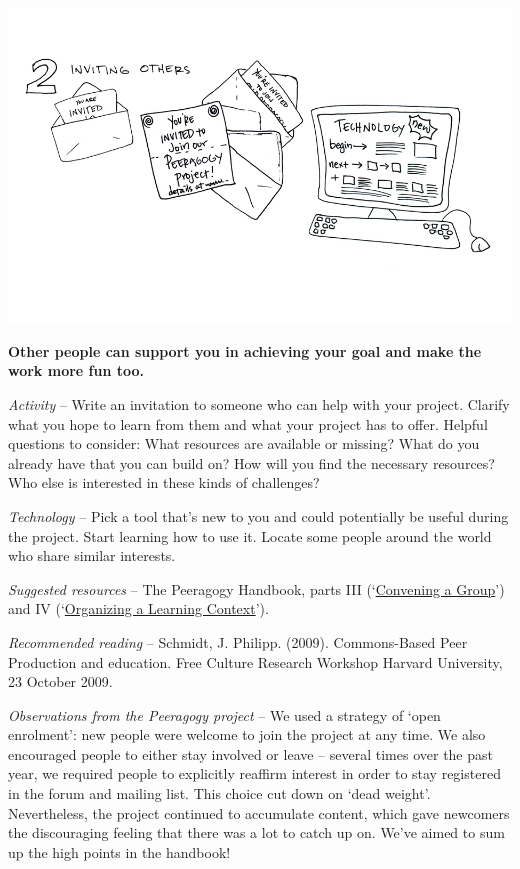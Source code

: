 \begin{center}
\includegraphics{./pictures/OpenBook-2-2.jpg}
\end{center}

\textbf{Other people can support you in achieving your goal and make the
work more fun too.}

\emph{Activity} -- Write an invitation to someone who can help with your
project. Clarify what you hope to learn from them and what your project
has to offer. Helpful questions to consider: What resources are
available or missing? What do you already have that you can build on?
How will you find the necessary resources? Who else is interested in
these kinds of challenges?

\emph{Technology} -- Pick a tool that's new to you and could potentially
be useful during the project. Start learning how to use it. Locate some
people around the world who share similar interests.

\emph{Suggested resources} -- The Peeragogy Handbook, parts III
(`\href{http://peeragogy.org/convening-a-group/}{Convening a Group}')
and IV
(`\href{http://peeragogy.org/organizing-a-learning-context/}{Organizing
a Learning Context}').

\emph{Recommended reading} -- Schmidt, J. Philipp. (2009). Commons-Based
Peer Production and education. Free Culture Research Workshop Harvard
University, 23 October 2009.

\emph{Observations from the Peeragogy project} -- We used a strategy of
`open enrolment': new people were welcome to join the project at any
time. We also encouraged people to either stay involved or leave --
several times over the past year, we required people to explicitly
reaffirm interest in order to stay registered in the forum and mailing
list. This choice cut down on `dead weight'. Nevertheless, the project
continued to accumulate content, which gave newcomers the discouraging
feeling that there was a lot to catch up on. We've aimed to sum up the
high points in the handbook!

